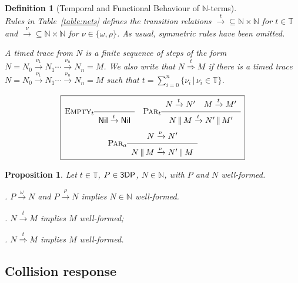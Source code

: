 \documentclass[11pt]{article}
\newcommand{\proc}{\sf{3DP}}
\newcommand{\NIL}{{\sf Nil}}
\def\sos#1#2{{\def\arraystretch{1.6}\begin{array}{c}#1\\\hline
#2\end{array}}}
\newcommand{\nar}[1]{\xrightarrow{#1}}
\newcommand{\dnar}[1]{\stackrel{#1}{\Rightarrow}}
\newcommand{\nets}{{\mathbb N}}
\def\name#1{\mbox{\sc #1}}
\newcommand{\timedomain}{{\mathbb T}}
\newtheorem{definition}{Definition}
\newtheorem{proposition}{Proposition}
\begin{document}
\begin{definition}[Temporal and Functional Behaviour of $\nets$-terms]\label{def:nets-behaviour}
\ \\ Rules in Table~\ref{table:nets} defines the transition relations $\nar{t} \subseteq \nets \times \nets$  for $t \in \timedomain$ and $\nar{\nu} \subseteq \nets \times \nets$ for $\nu \in
\{\omega,\rho\}$. As usual, symmetric rules have been omitted.

A {\em timed trace} from  $N$ is a finite sequence of steps of the form $N=N_0 \nar{\nu_1} N_1
\cdots \nar{\nu_{n}} N_{n} = M$. We also write that $N \dnar{t} M$ if there is a timed trace
$N=N_0 \nar{\nu_1} N_1  \cdots \nar{\nu_{n}} N_{n} = M$ such that $t = \sum\limits_{i=0}^{n} \{\nu_i \,|\, \nu_i \in \timedomain \} $.
\end{definition}


\begin{table}[th]
\[
\begin{array}{|c|}
\hline
\name{Empty$_{t}$}\sos{}{
\NIL \nar{t} \NIL} \quad
\name{Par$_t$} \sos{N \nar{t} N' \quad M \nar{t} M'}
{N \,\|\, M \nar{t} N'\,\|\, M'}  \\
\name{Par$_{a}$}\sos{N \nar{\nu} N'}{N \,\|\, M \nar{\nu} N'\,\|\, M}\\
\hline
\end{array}\]
\caption{Temporal and functional behaviour of 3D networks}
\label{table:nets}
\end{table}


\begin{proposition}\label{prop:net-closure}
Let $t \in \timedomain$, $P\in \proc$, $N\in \nets$, with $P$ and $N$ well-formed.

\par\smallskip{}. $P \nar{\omega} N$ and $P \nar{\rho} N$ implies $N \in \nets$
well-formed.

\par\smallskip{}. $N \nar{t} M$ implies $M$ well-formed;

\par\medskip{}. $N \dnar{t} M$ implies $M$ well-formed.
\end{proposition}

\subsection{Collision response}\label{sec:response}
\end{document}
